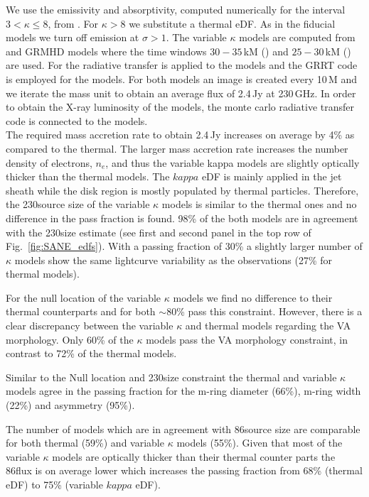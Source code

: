 We use the emissivity and absorptivity, computed numerically for the interval $3 < \kappa \le 8$, from  \cite{2016ApJ...822...34P}. For $\kappa > 8$ we substitute a thermal eDF.  As in the fiducial models we turn off emission at $\sigma > 1$.
{The variable $\kappa$ models are computed from \hamr and \bhac GRMHD models where the time windows $30-35$\,kM (\hamr) and $25-30$\,kM (\bhac) are used. For the radiative transfer \ipole is applied to the \hamr models and the GRRT code \bhoss is employed for the \bhac models. For both models an image is created every 10\,M and we iterate the mass unit to obtain an average flux of 2.4\,Jy at 230\,GHz. In order to obtain the X-ray luminosity of the models, the monte carlo radiative transfer code \grmonty is connected to the \hamr models.}\\
The required mass accretion rate to obtain 2.4\,Jy increases on average by 4\% as compared to the thermal. The larger mass accretion rate increases the number density of electrons, $n_e$, and thus the variable kappa models are slightly optically thicker than the thermal models.
 The $kappa$ eDF is mainly applied in the jet sheath while the disk region is mostly populated by thermal particles. Therefore, the 230\GHz source size of the variable $\kappa$ models is similar to the thermal ones and no difference in the pass fraction is found. 98\% of the both models are in agreement with the 230\GHz size estimate (see first and second panel in the top row of Fig.~\ref{fig:SANE_edfs}). With a passing fraction of 30\% a slightly larger number of $\kappa$ models show the same lightcurve variability as the observations (27\% for thermal models).

 For the null location of the variable $\kappa$ models we find no difference to their thermal counterparts and for both $\sim$80\% pass this constraint. However, there is a clear discrepancy between the variable $\kappa$ and thermal models regarding the VA morphology. Only 60\% of the $\kappa$ models pass the VA morphology constraint, in contrast to 72\% of the thermal models.  

Similar to the Null location and 230\GHz size constraint the thermal and variable $\kappa$ models agree in the passing fraction for the m-ring diameter (66\%), m-ring width (22\%) and asymmetry (95\%). 

The number of models which are in agreement with 86\GHz source size are comparable for both thermal (59\%) and variable $\kappa$ models (55\%). Given that most of the variable $\kappa$ models are optically thicker than their thermal counter parts the 86\GHz flux is on average lower which increases the passing fraction from 68\% (thermal eDF) to 75\% (variable $kappa$ eDF).

